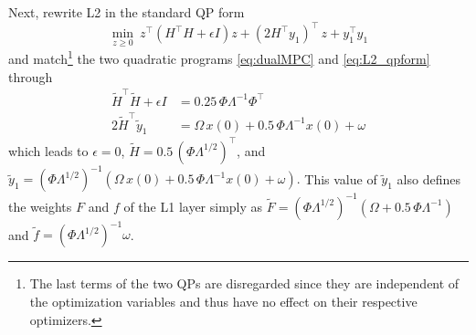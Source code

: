 Next, rewrite L2 in the standard QP form
\begin{equation}
	\label{eq:L2_qpform}
	\min_{z \geq 0} \ z^\top(H^\top H + \epsilon I )z + (2H^\top y_1)^\top \, z + y_1^\top y_1
\end{equation}
and match\footnote{The last terms of the two QPs are disregarded since they are independent of the optimization variables and thus have no effect on their respective optimizers.} the two quadratic programs \eqref{eq:dualMPC} and \eqref{eq:L2_qpform} through  %
\begin{subequations}
	\label{eq:Landg1}
	\begin{align}
		\tilde{H}^\top \tilde{H} + \epsilon I & = 0.25 \, \Phi \Lambda^{-1} \Phi^\top \\
		2 \tilde{H}^\top \tilde{y}_1 & = \Omega \, x(0) + 0.5 \, \Phi \Lambda^{-1}x(0) + \omega %
	\end{align}
\end{subequations}
which leads to $\epsilon = 0$, $\tilde{H} = 0.5 \, (\Phi \Lambda^{1/2})^\top$, and $\tilde{y}_1 = (\Phi \Lambda^{1/2})^{-1} (\Omega \, x(0) + 0.5 \, \Phi \Lambda^{-1} x(0) + \omega).$ This value of $\tilde y_1$ also defines the weights $F$ and $f$ of the L1 layer simply as $\tilde{F} = (\Phi \Lambda^{1/2})^{-1}(\Omega+0.5 \, \Phi \Lambda^{-1})$ and $\tilde{f} = (\Phi \Lambda^{1/2})^{-1}\omega$. 

